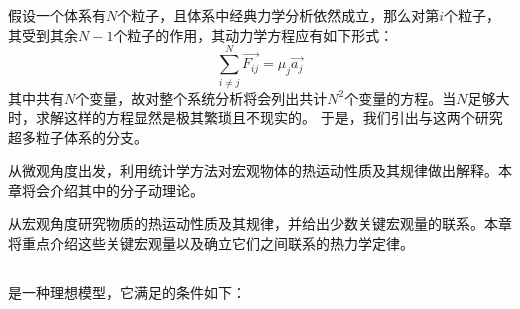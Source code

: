 \chapter[热力学]{}
    \section[导论]{}
        假设一个体系有$N$个粒子，且体系中经典力学分析依然成立，那么对第$i$个粒子，其受到其余$N-1$个粒子的作用，其动力学方程应有如下形式：
        \begin{equation*}
            \sum_{i\neq j}^N \vec{F_{ij}} = \mu_j \vec{a_j}
        \end{equation*}    
        其中共有$N$个变量，故对整个系统分析将会列出共计$N^2$个变量的方程。当$N$足够大时，求解这样的方程显然是极其繁琐且不现实的。
        于是，我们引出与\linebreak 这两个研究超多粒子体系的分支。

        从微观角度出发，利用统计学方法对宏观物体的热运动性质及其规律做出解释。本章将会介绍其中的分子动理论。

        从宏观角度研究物质的热运动性质及其规律，并给出少数关键宏观量的联系。本章将重点介绍这些关键宏观量以及确立它们之间联系的热力学定律。
    \section[理想气体]{}
        是一种理想模型，它满足的条件如下：
        
